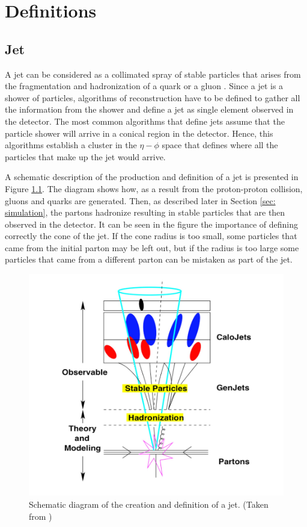 \graphicspath{{Definitions/Figures/}}

\chapter{Definitions} \label{sec:definitions}

\section{Jet}

A jet can be considered as a collimated spray of stable particles that arises from the fragmentation and hadronization of a quark or a gluon \cite{Jets}. Since a jet is a shower of particles, algorithms of reconstruction have to be defined to gather all the information from the shower and define a jet as single element observed in the detector. The most common algorithms that define jets assume that the particle shower will arrive in a conical region in the detector. Hence, this algorithms establish a cluster in the $\eta-\phi$ space that defines where all the particles that make up the jet would arrive.

A schematic description of the production and definition of a jet is presented in Figure \ref{fig: jet diagram}. The diagram shows how, as a result from the proton-proton collision, gluons and quarks are generated. Then, as described later in Section \ref{sec: simulation}, the partons hadronize resulting in stable particles that are then observed in the detector. It can be seen in the figure the importance of defining correctly the cone of the jet. If the cone radius is too small, some particles that came from the initial parton may be left out, but if the radius is too large some particles that came from a different parton can be mistaken as part of the jet.

\begin{figure}[H]
\centering
\includegraphics[width = 0.7\linewidth]{jetsDiagram}
\caption{Schematic diagram of the creation and definition of a jet. (Taken from \cite{Jets})}
\label{fig: jet diagram}
\end{figure}

